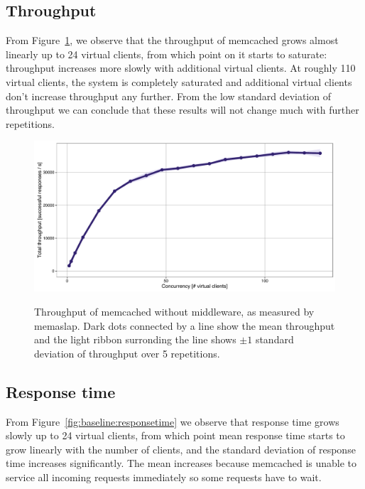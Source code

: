 \documentclass[11pt]{article}
\begin{document}
\subsection{Throughput}\label{sec:baseline:tput}

From Figure~\ref{fig:baseline:throughput}, we observe that the throughput of memcached grows almost linearly up to 24 virtual clients, from which point on it starts to saturate: throughput increases more slowly with additional virtual clients. At roughly 110 virtual clients, the system is completely saturated and additional virtual clients don't increase throughput any further. From the low standard deviation of throughput we can conclude that these results will not change much with further repetitions.

\begin{figure}[p]
\centering
\includegraphics[width=\textwidth]{../results/baseline/graphs/throughput.pdf}
\label{fig:baseline:throughput}
\caption{Throughput of memcached without middleware, as measured by memaslap. Dark dots connected by a line show the mean throughput and the light ribbon surronding the line shows $\pm 1$ standard deviation of throughput over 5 repetitions.}
\end{figure}

\subsection{Response time}\label{sec:baseline:rt}

From Figure~\ref{fig:baseline:responsetime} we observe that response time grows slowly up to 24 virtual clients, from which point mean response time starts to grow linearly with the number of clients, and the standard deviation of response time increases significantly. The mean increases because memcached is unable to service all incoming requests immediately so some requests have to wait.
\end{document}
